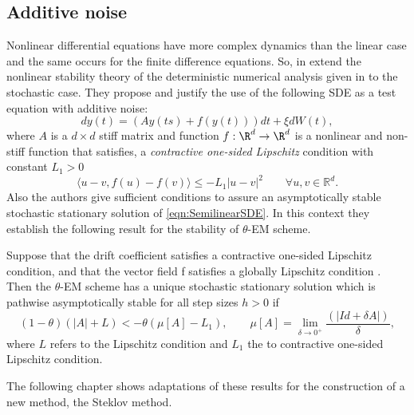 \subsection*{Additive noise}
		Nonlinear differential equations have more complex  dynamics than the linear case and
	the same  occurs for the finite difference equations. So,  \citeauthor*{Caraballo2006} in
	\cite{Caraballo2006}  extend the nonlinear stability theory of the deterministic
	numerical  analysis given in \cite{kloeden1999towards} to the stochastic
	case. They propose and justify the use of the following SDE as a test equation with additive noise:
	\begin{equation}\label{eqn:SemilinearSDE}
		dy(t)=\left(Ay(ts)+f(y(t))\right)dt+\xi dW(t),
	\end{equation}
	where $A$ is a $d \times d$ stiff matrix and function $f : \R^d \to \R^d $ is a nonlinear and non-stiff function 
	that satisfies, a
	{\it contractive one-sided Lipschitz} condition with constant
	$L_1>0$
	\begin{equation}\label{cl}
		\langle
			u - v,f(u)-f(v)
		\rangle\leq
		-L_1|u-v|^2\qquad \forall u,v\in \mathbb{R}^d.
	\end{equation}
Also the authors give sufficient conditions to assure an asymptotically stable stochastic stationary solution
of \eqref{eqn:SemilinearSDE}. In this context they establish the following result for the stability of $\theta$-EM 
scheme.
\begin{thm}
	Suppose that the drift coefficient satisfies a contractive one-sided Lipschitz condition, and that the vector field 
	f satisfies a globally Lipschitz condition . Then the $\theta$-EM scheme has a unique stochastic stationary 
	solution 
	which is pathwise asymptotically stable for all step sizes $h> 0$
	if
	$$
		(1-\theta) (|A|+L) <-\theta (\mu[A] - L_1),
		\qquad
		\mu[A] = \lim_{\delta \to 0^+} \frac{(|Id + \delta A|)}{\delta},
	$$
	where $L$ refers to the Lipschitz condition and $L_1$  the to contractive one-sided Lipschitz condition.
\end{thm}












The following chapter shows adaptations of these results for the construction of a new method, the Steklov method.

